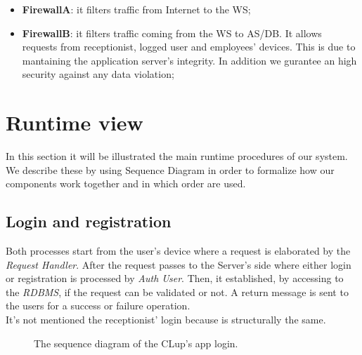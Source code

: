 \begin{itemize}

\item \textbf{FirewallA}: it filters traffic from Internet to the WS;

\item \textbf{FirewallB}: it filters traffic coming from the WS to AS/DB. It allows requests from receptionist, logged user and employees' devices. This is due to mantaining the application server's integrity. In addition we gurantee an high security against any data violation;

\end{itemize}

\bigskip

\section{Runtime view}
In this section it will be illustrated the main runtime procedures of our system. We describe these by using Sequence Diagram in order to formalize how our components work together and in which order are used.

\pagebreak


\subsection{Login and registration}

Both processes start from the user's device where a request is elaborated by the \textit{Request Handler}. After the request passes to the Server's side where either login or registration is processed by \textit{Auth User}. Then, it established, by accessing to the \textit{RDBMS}, if the request can be validated or not. A return message is sent to the users for a success or failure operation. \\
It's not mentioned the receptionist' login because is structurally the same.



\begin{figure}[H]
  \label{LoginSD}
  \centering
    \caption{The sequence diagram of the CLup's app login.}
\end{figure} 


